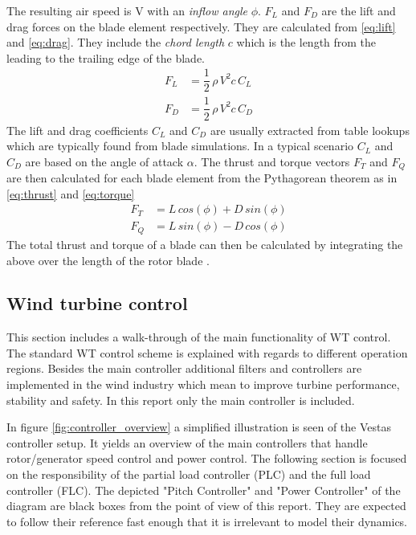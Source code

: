 The resulting air speed is V with an \textit{inflow angle} $ \phi $. $ F_L $ and $ F_D $ are the lift and drag forces on the blade element respectively. They are calculated from \cref{eq:lift} and \cref{eq:drag}. They include the \textit{chord length} $ c $ which is the length from the leading to the trailing edge of the blade.
\begin{align}
	F_L &= \dfrac{1}{2}\,  \rho \, V^2 c \, C_L \label{eq:lift}\\
	F_D &= \dfrac{1}{2} \, \rho \, V^2 c \, C_D \label{eq:drag}
\end{align}
The lift and drag coefficients $ C_L $ and $ C_D $ are usually extracted from table lookups which are typically found from blade simulations. In a typical scenario $ C_L $ and $ C_D $ are based on the angle of attack $ \alpha $. The thrust and torque vectors $ F_T $ and $ F_Q $ are then calculated for each blade element from the Pythagorean theorem as in \cref{eq:thrust} and \cref{eq:torque}
\begin{align}
	F_T &= L \, cos(\phi) + D \, sin(\phi) \label{eq:thrust} \\
	F_Q &= L \, sin(\phi) - D \, cos(\phi) \label{eq:torque}
\end{align}
The total thrust and torque of a blade can then be calculated by integrating the above over the length of the rotor blade \cite{Knudsen2013}.


\subsection{Wind turbine control} \label{sec:theory_ctrl}
This section includes a walk-through of the main functionality of WT control. The standard WT control scheme is explained with regards to different operation regions. Besides the main controller additional filters and controllers are implemented in the wind industry which mean to improve turbine performance, stability and safety. In this report only the main controller is included.

\medskip
In figure \cref{fig:controller_overview} a simplified illustration is seen of the Vestas controller setup. It yields an overview of the main controllers that handle rotor/generator speed control and power control. The following section is focused on the responsibility of the partial load controller (PLC) and the full load controller (FLC). The depicted "Pitch Controller" and "Power Controller" of the diagram are black boxes from the point of view of this report. They are expected to follow their reference fast enough that it is irrelevant to model their dynamics.

